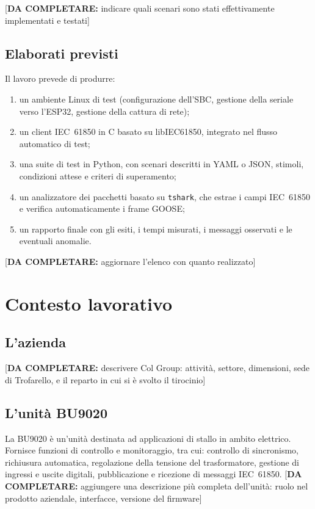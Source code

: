 \documentclass[11pt,a4paper,italian,oneside,openany]{book}
\newcommand{\daf}[1]{{\color{red}[\textbf{DA COMPLETARE:} #1]}}
\begin{document}
\daf{indicare quali scenari sono stati effettivamente implementati e testati}

\section{Elaborati previsti}
Il lavoro prevede di produrre:
\begin{enumerate}
    \item un ambiente Linux di test (configurazione dell'SBC, gestione della seriale verso l'ESP32, gestione della cattura di rete);
    \item un client IEC~61850 in C basato su libIEC61850, integrato nel flusso automatico di test;
    \item una suite di test in Python, con scenari descritti in YAML o JSON, stimoli, condizioni attese e criteri di superamento;
    \item un analizzatore dei pacchetti basato su \texttt{tshark}, che estrae i campi IEC~61850 e verifica automaticamente i frame GOOSE;
    \item un rapporto finale con gli esiti, i tempi misurati, i messaggi osservati e le eventuali anomalie.
\end{enumerate}
\daf{aggiornare l'elenco con quanto realizzato}

\chapter{Contesto lavorativo}\label{cap:contesto}
\section{L'azienda}
\daf{descrivere Col Group: attività, settore, dimensioni, sede di Trofarello, e il reparto in cui si è svolto il tirocinio}

\section{L'unità BU9020}
La BU9020 è un'unità destinata ad applicazioni di stallo in ambito elettrico. Fornisce funzioni di controllo e monitoraggio, tra cui: controllo di sincronismo, richiusura automatica, regolazione della tensione del trasformatore, gestione di ingressi e uscite digitali, pubblicazione e ricezione di messaggi IEC~61850. \daf{aggiungere una descrizione più completa dell'unità: ruolo nel prodotto aziendale, interfacce, versione del firmware}
\end{document}
